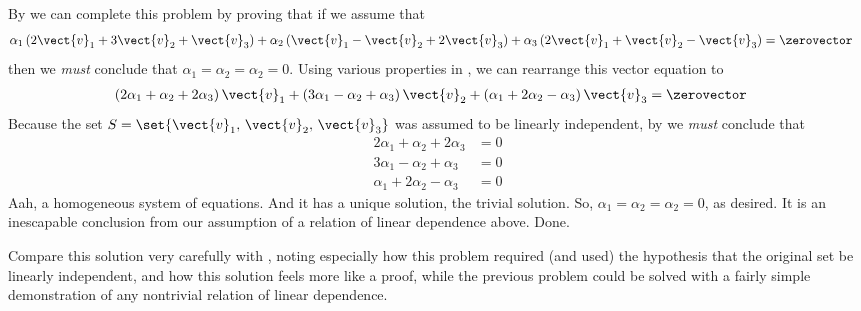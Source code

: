 By  we can complete this problem by proving that if we assume that
%
\begin{align*}
\alpha_1\left(2\vect{v}_1+3\vect{v}_2+\vect{v}_3\right)+
\alpha_2\left(\vect{v}_1-\vect{v}_2+2\vect{v}_3\right)+
\alpha_3\left(2\vect{v}_1+\vect{v}_2-\vect{v}_3\right)
&=
\zerovector
\end{align*}
%
then we {\em must} conclude that $\alpha_1=\alpha_2=\alpha_2=0$.
Using various properties in , we can rearrange this vector equation to
%
\begin{align*}
\left(2\alpha_1+\alpha_2+2\alpha_3\right)\vect{v}_1+
\left(3\alpha_1-\alpha_2+\alpha_3\right)\vect{v}_2+
\left(\alpha_1+2\alpha_2-\alpha_3\right)\vect{v}_3
&=
\zerovector
%
\end{align*}
%
Because the set $S=\set{\vect{v}_1,\,\vect{v}_2,\,\vect{v}_3}$ was assumed to be linearly independent, by  we {\em must} conclude that
%
\begin{align*}
2\alpha_1+\alpha_2+2\alpha_3&=0\\
3\alpha_1-\alpha_2+\alpha_3&=0\\
\alpha_1+2\alpha_2-\alpha_3&=0
\end{align*}
%
Aah, a homogeneous system of equations.  And it has a unique solution, the trivial solution.  So, $\alpha_1=\alpha_2=\alpha_2=0$, as desired.  It is an inescapable conclusion from our assumption of a relation of linear dependence above.  Done.\par
%
Compare this solution very carefully with , noting especially how this problem required (and used) the hypothesis that the original set be linearly independent, and how this solution feels more like a proof, while the previous problem could be solved with a fairly simple demonstration of any nontrivial relation of linear dependence.